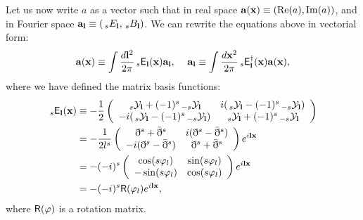 \documentclass[a4paper,10pt]{article}
\begin{document}
    Let us now write $a$ as a vector such that in real space ${\bf a}({\bf x})\equiv({\rm Re}(a),{\rm Im}(a))$, and in Fourier space ${\bf a}_{\bf l}\equiv(\,_sE_{\bf l},\,_sB_{\bf l})$. We can rewrite the equations above in vectorial form:
    \begin{equation}
      {\bf a}({\bf x})\equiv\int\frac{d{\bf l}^2}{2\pi}\,_s{\sf E}_{\bf l}({\bf x}){\bf a}_{\bf l},\hspace{12pt}{\bf a}_{\bf l}\equiv\int\frac{d{\bf x}^2}{2\pi}\,_s{\sf E}^\dag_{\bf l}({\bf x}){\bf a}({\bf x}),
    \end{equation}
    where we have defined the matrix basis functions:
    \begin{align}
      \,_s{\sf E}_{\bf l}({\bf x})
      &\equiv-\frac{1}{2}
      \left(\begin{array}{cc}
                 \,_s{\cal Y}_{\bf l}+(-1)^s\,_{-s}{\cal Y}_{\bf l}  & i(\,_s{\cal Y}_{\bf l}-(-1)^s\,_{-s}{\cal Y}_{\bf l}) \\
              -i(\,_s{\cal Y}_{\bf l}-(-1)^s\,_{-s}{\cal Y}_{\bf l}) &   \,_s{\cal Y}_{\bf l}+(-1)^s\,_{-s}{\cal Y}_{\bf l}
            \end{array}\right)\\
      &=-\frac{1}{2l^s}
      \left(\begin{array}{cc}
                 \eth^s+\bar{\eth}^s & i(\eth^s-\bar{\eth}^s) \\
              -i(\eth^s-\bar{\eth}^s) &  \eth^s+\bar{\eth}^s
            \end{array}\right)e^{i{\bf l}{\bf x}}\\
      &=-(-i)^s
      \left(\begin{array}{cc}
                 \cos(s\varphi_l) & \sin(s\varphi_l) \\
                -\sin(s\varphi_l) & \cos(s\varphi_l)
            \end{array}\right)e^{i{\bf l}{\bf x}}\\
      &=-(-i)^s{\sf R}(\varphi_l)e^{i{\bf l}{\bf x}},
    \end{align}
    where ${\sf R}(\varphi)$ is a rotation matrix.
    
\end{document}
